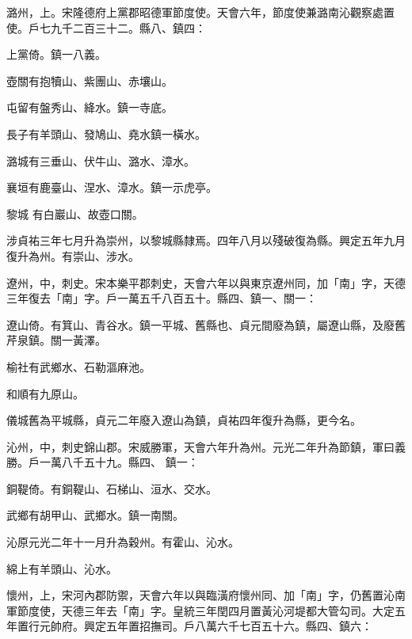 \begin{pinyinscope}
 潞州，上。宋隆德府上黨郡昭德軍節度使。天會六年，節度使兼潞南沁觀察處置使。戶七九千二百三十二。縣八、鎮四：



 上黨倚。鎮一八義。



 壺關有抱犢山、紫團山、赤壤山。



 屯留有盤秀山、絳水。鎮一寺底。



 長子有羊頭山、發鳩山、堯水鎮一橫水。



 潞城有三垂山、伏牛山、潞水、漳水。



 襄垣有鹿臺山、涅水、漳水。鎮一示虎亭。



 黎城
 有白巖山、故壺口關。



 涉貞祐三年七月升為崇州，以黎城縣隸焉。四年八月以殘破復為縣。興定五年九月復升為州。有崇山、涉水。



 遼州，中，刺史。宋本樂平郡刺史，天會六年以與東京遼州同，加「南」字，天德三年復去「南」字。戶一萬五千八百五十。縣四、鎮一、關一：



 遼山倚。有箕山、青谷水。鎮一平城、舊縣也、貞元間廢為鎮，屬遼山縣，及廢舊芹泉鎮。關一黃澤。



 榆社有武鄉水、石勒漚麻池。



 和順有九原山。



 儀城舊為平城縣，貞元二年廢入遼山為鎮，貞祐四年復升為縣，更今名。



 沁州，中，刺史錦山郡。宋威勝軍，天會六年升為州。元光二年升為節鎮，軍曰義勝。戶一萬八千五十九。縣四、
 鎮一：



 銅鞮倚。有銅鞮山、石梯山、洹水、交水。



 武鄉有胡甲山、武鄉水。鎮一南關。



 沁原元光二年十一月升為穀州。有霍山、沁水。



 綿上有羊頭山、沁水。



 懷州，上，宋河內郡防禦，天會六年以與臨潢府懷州同、加「南」字，仍舊置沁南軍節度使，天德三年去「南」字。皇統三年閏四月置黃沁河堤都大管勾司。大定五年置行元帥府。興定五年置招撫司。戶八萬六千七百五十六。縣四、鎮六：




\end{pinyinscope}
